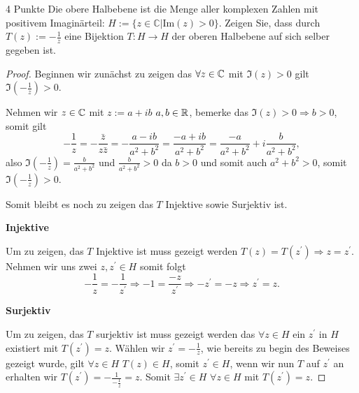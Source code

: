 \documentclass{problemset}
\begin{document}
\begin{problem}{4 Punkte}
Die obere Halbebene ist die Menge aller komplexen Zahlen mit positivem Imaginärteil: $H := \{z \in \mathbb{C} | \text{Im}(z) > 0\}$. Zeigen Sie, dass durch $T(z) := -\frac{1}{z}$ eine Bijektion $T : H \rightarrow H$ der oberen Halbebene auf sich selber gegeben ist.

\begin{proof}
	Beginnen wir zunächst zu zeigen das $\forall z \in \mathbb{C}$ mit $\Im(z) > 0$ gilt $\Im(-\frac{1}{z}) > 0$.

	Nehmen wir $z \in \mathbb{C}$ mit $z := a + ib$ $a,b \in \mathbb{R}$, bemerke das
	$\Im(z) > 0 \Rightarrow b > 0$, somit gilt
	\[
		- \frac{1}{z} = - \frac{\bar{z}}{z\bar{z}} = - \frac{a - ib}{a^2 + b^2} = \frac{-a + ib}{a^2 + b^2} = \frac{-a}{a^2+b^2} + i\frac{b}{a^2+b^2},
	\] also $\Im(-\frac{1}{z}) = \frac{b}{a^2 + b^2}$ und $\frac{b}{a^2 + b^2} > 0$ da
	$b > 0$ und somit auch $a^2 + b^2 > 0$, somit $\Im(-\frac{1}{z}) > 0$.

	Somit bleibt es noch zu zeigen das $T$ Injektive sowie Surjektiv ist.

	\textbf{Injektive}

	Um zu zeigen, das $T$ Injektive ist muss gezeigt werden $T(z) = T(z^\prime)
		\Rightarrow z = z^\prime$. Nehmen wir uns zwei $z, z^\prime \in H$ somit folgt
	\[
		- \frac{1}{z} = - \frac{1}{z^\prime} \Rightarrow -1 = \frac{-z}{z^\prime} \Rightarrow -z^\prime = -z \Rightarrow z^\prime = z.
	\]

	\textbf{Surjektiv}

	Um zu zeigen, das $T$ surjektiv ist muss gezeigt werden das $\forall z \in H$
	ein $z^\prime$ in $H$ existiert mit $T(z^\prime) = z$. Wählen wir $z^\prime = -
		\frac{1}{z}$, wie bereits zu begin des Beweises gezeigt wurde, gilt $\forall z
		\in H$ $T(z) \in H$, somit $z^\prime \in H$, wenn wir nun $T$ auf $z^\prime$ an
	erhalten wir $T(z^\prime) = -\frac{1}{-\frac{1}{z}} = z$. Somit $\exists
		z^\prime \in H$ $\forall z \in H$ mit $T(z^\prime) = z$.

\end{proof}
\end{problem}
\end{document}
